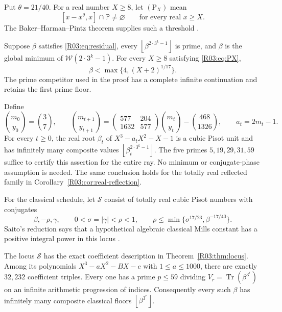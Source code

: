 \documentclass[11pt,a4paper]{article}
\theoremstyle{definition}\newtheorem{definition}[theorem]{Definition}
\theoremstyle{remark}\newtheorem{remark}[theorem]{Remark}
\newcommand{\PP}{\mathbb P}\newcommand{\W}{\mathcal W}\newcommand{\SaitoL}{\mathcal S}
\newcommand{\floor}[1]{\left\lfloor#1\right\rfloor}
\DeclareMathOperator{\Tr}{Tr}\DeclareMathOperator{\tr}{tr}\DeclareMathOperator{\Nm}{N}
\begin{document}
Put $\theta=21/40$. For a real number $X\ge8$, let $(\mathrm P_X)$ mean
\begin{equation}\label{R03:eq:PX}
 [x-x^\theta,x]\cap\PP\ne\varnothing
 \qquad\text{for every real }x\ge X.
 \tag{$\mathrm P_X$}
\end{equation}
The Baker--Harman--Pintz theorem supplies such a threshold
\cite[Theorem~1]{BHP}.

\begin{mainthm}\label{R03:thm:height}
Suppose $\beta$ satisfies \eqref{R03:eq:residual}, every
$\floor{\beta^{2\cdot3^k-1}}$ is prime, and $\beta$ is the global
minimum of $\W(2\cdot3^k-1)$. For every $X\ge8$ satisfying
\eqref{R03:eq:PX},
\[
 \beta<\max\{4,(X+2)^{1/17}\}.
\]
The prime competitor used in the proof has a complete infinite
continuation and retains the first prime floor.
\end{mainthm}

\begin{mainthm}\label{R03:thm:pell}
Define
\begin{equation}\label{R03:eq:pell-main}
 \binom{m_0}{y_0}=\binom37,\qquad
 \binom{m_{t+1}}{y_{t+1}}
 =\begin{pmatrix}577&204\\1632&577\end{pmatrix}
  \binom{m_t}{y_t}-\binom{468}{1326},\qquad a_t=2m_t-1.
\end{equation}
For every $t\ge0$, the real root $\beta_t$ of
$X^3-a_tX^2-X-1$ is a cubic Pisot unit and has infinitely many
composite values $\floor{\beta_t^{2\cdot3^k-1}}$. The five primes
$5,19,29,31,59$ suffice to certify this assertion for the entire ray.
No minimum or conjugate-phase assumption is needed.
The same conclusion holds for the totally real reflected family in
Corollary~\ref{R03:cor:real-reflection}.
\end{mainthm}

For the classical schedule, let $\SaitoL$ consist of totally real
cubic Pisot numbers with conjugates
\begin{equation}\label{R03:eq:S}
 \beta,-\rho,\gamma,\qquad
 0<\sigma=|\gamma|<\rho<1,\qquad
 \rho\le\min\{\sigma^{17/23},\beta^{-17/40}\}.
\end{equation}
Saito's reduction says that a hypothetical algebraic classical Mills
constant has a positive integral power in this locus
\cite[Theorem~1.7]{Saito}.

\begin{mainthm}\label{R03:thm:finite}
The locus $\SaitoL$ has the exact coefficient description in
Theorem~\ref{R03:thm:locus}. Among its polynomials
$X^3-aX^2-BX-c$ with $1\le a\le1000$, there are exactly $32,232$
coefficient triples. Every one has a prime $p\le59$ dividing
$V_r=\Tr(\beta^{3^r})$ on an infinite arithmetic progression of
indices. Consequently every such $\beta$ has infinitely many composite
classical floors $\floor{\beta^{3^r}}$.
\end{mainthm}
\end{document}
